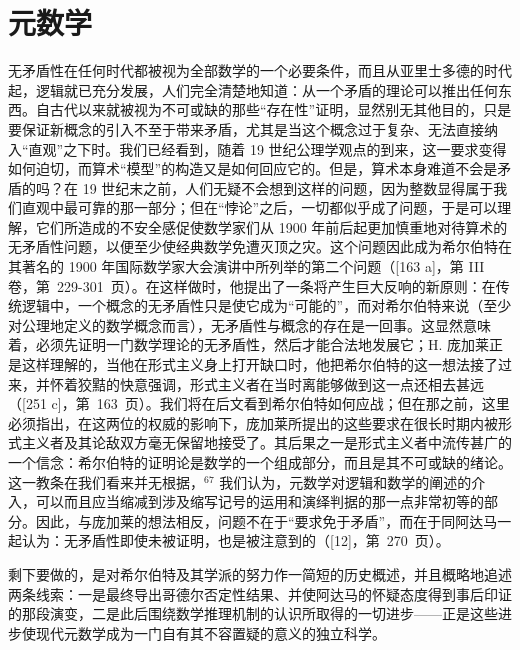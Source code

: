 \section*{元数学}
{}

无矛盾性在任何时代都被视为全部数学的一个必要条件，而且从亚里士多德的时代起，逻辑就已充分发展，人们完全清楚地知道：从一个矛盾的理论可以推出任何东西。自古代以来就被视为不可或缺的那些“存在性”证明，显然别无其他目的，只是要保证新概念的引入不至于带来矛盾，尤其是当这个概念过于复杂、无法直接纳入“直观”之下时。我们已经看到，随着 19 世纪公理学观点的到来，这一要求变得如何迫切，而算术“模型”的构造又是如何回应它的。但是，算术本身难道不会是矛盾的吗？在 19 世纪末之前，人们无疑不会想到这样的问题，因为整数显得属于我们直观中最可靠的那一部分；但在“悖论”之后，一切都似乎成了问题，于是可以理解，它们所造成的不安全感促使数学家们从 1900 年前后起更加慎重地对待算术的无矛盾性问题，以便至少使经典数学免遭灭顶之灾。这个问题因此成为希尔伯特在其著名的 1900 年国际数学家大会演讲中所列举的第二个问题（{[}163 a{]}，第 III 卷，第~229-301~页）。在这样做时，他提出了一条将产生巨大反响的新原则：在传统逻辑中，一个概念的无矛盾性只是使它成为“可能的”，而对希尔伯特来说（至少对公理地定义的数学概念而言），无矛盾性与概念的存在是一回事。这显然意味着，必须先证明一门数学理论的无矛盾性，然后才能合法地发展它；H. 庞加莱正是这样理解的，当他在形式主义身上打开缺口时，他把希尔伯特的这一想法接了过来，并怀着狡黠的快意强调，形式主义者在当时离能够做到这一点还相去甚远（{[}251 c{]}，第~163~页）。我们将在后文看到希尔伯特如何应战；但在那之前，这里必须指出，在这两位的权威的影响下，庞加莱所提出的这些要求在很长时期内被形式主义者及其论敌双方毫无保留地接受了。其后果之一是形式主义者中流传甚广的一个信念：希尔伯特的证明论是数学的一个组成部分，而且是其不可或缺的绪论。这一教条在我们看来并无根据，\(^{67}\) 我们认为，元数学对逻辑和数学的阐述的介入，可以而且应当缩减到涉及缩写记号的运用和演绎判据的那一点非常初等的部分。因此，与庞加莱的想法相反，问题不在于“要求免于矛盾”，而在于同阿达马一起认为：无矛盾性即使未被证明，也是被注意到的（{[}12{]}，第~270~页）。

剩下要做的，是对希尔伯特及其学派的努力作一简短的历史概述，并且概略地追述两条线索：一是最终导出哥德尔否定性结果、并使阿达马的怀疑态度得到事后印证的那段演变，二是此后围绕数学推理机制的认识所取得的一切进步——正是这些进步使现代元数学成为一门自有其不容置疑的意义的独立科学。

